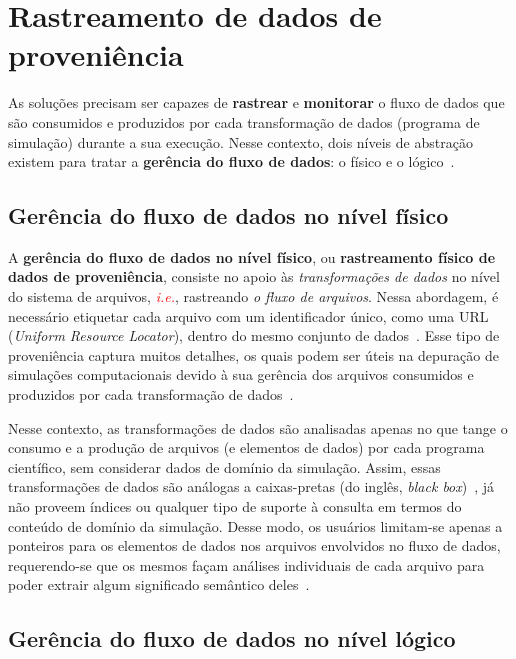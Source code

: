\section{Rastreamento de dados de proveniência}

As soluções precisam ser capazes de \textbf{rastrear} e \textbf{monitorar} o fluxo de dados que são consumidos e produzidos por cada transformação de dados (programa de simulação) durante a sua execução. Nesse contexto, dois níveis de abstração existem para tratar a \textbf{gerência do fluxo de dados}: o físico e o lógico~\cite{silva2015propostadoutorado}.

\subsection{Gerência do fluxo de dados no nível físico}%
\label{sec:gerencia-do-fluxo-de-dados-no-nivel-fisico}

A \textbf{gerência do fluxo de dados no nível físico}, ou \textbf{rastreamento físico de dados de proveniência}, consiste no apoio às \emph{transformações de dados} no nível do sistema de arquivos, \textit{\textcolor{red}{i.e.}}, rastreando \emph{o fluxo de arquivos}. Nessa abordagem, é necessário etiquetar cada arquivo com um identificador único, como uma URL (\textit{Uniform Resource Locator}), dentro do mesmo conjunto de dados~\cite{silva2015propostadoutorado}. Esse tipo de proveniência captura muitos detalhes, os quais podem ser úteis na depuração de simulações computacionais devido à sua gerência dos arquivos consumidos e produzidos por cada transformação de dados~\cite{silva2017raw}.

Nesse contexto, as transformações de dados são analisadas apenas no que tange o consumo e a produção de arquivos (e elementos de dados) por cada programa científico, sem considerar dados de domínio da simulação. Assim, essas transformações de dados são análogas a caixas-pretas (do inglês, \textit{black box})~\cite{silva2017raw}, já não proveem índices ou qualquer tipo de suporte à consulta em termos do conteúdo de domínio da simulação. Desse modo, os usuários limitam-se apenas a ponteiros para os elementos de dados nos arquivos envolvidos no fluxo de dados, requerendo-se que os mesmos façam análises individuais de cada arquivo para poder extrair algum significado semântico deles~\cite{silva2015propostadoutorado}.

\subsection{Gerência do fluxo de dados no nível lógico}%
\label{sec:gerencia-do-fluxo-de-dados-no-nivel-logico}

